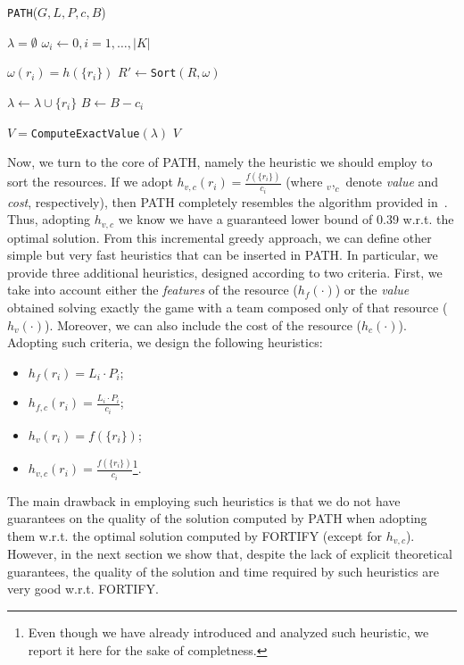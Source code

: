 \begin{algorithm}\caption{\texttt{PATH}($G,L,P,c,B$)}\label{alg:approximation}
\begin{algorithmic}[1]
\State $\lambda = \emptyset$\label{alg:init_1}
\State $\omega_i \leftarrow 0, i=1,\ldots,|K|$\label{alg:init_2}

\label{alg:give_values}
	\State $\omega(r_i) = h(\{r_i\})$
\EndFor
\State $R' \leftarrow $\texttt{Sort}$(R,\omega)$\label{alg:sort}

\label{alg:insert_init}
		\State $\lambda \leftarrow \lambda \cup \{r_i\}$
		\State $B \leftarrow B - c_i$
	\EndWhile
\EndFor\label{alg:insert_end}

\State $V = $\texttt{ComputeExactValue}$(\lambda)$\label{alg:evaluate}
\State \Return $V$
\end{algorithmic}
\end{algorithm}

Now, we turn to the core of PATH, namely the heuristic we should employ to sort the resources. If we adopt $h_{v,c}(r_i) = \frac{f(\{r_i\})}{c_i}$ (where $_v, _c$ denote \textit{value} and \textit{cost}, respectively), then PATH completely resembles the algorithm provided in~\cite{khuller1999budgeted}. Thus, adopting $h_{v,c}$ we know we have a guaranteed lower bound of 0.39 w.r.t. the optimal solution. From this incremental greedy approach, we can define other simple but very fast heuristics that can be inserted in PATH. In particular, we provide three additional heuristics, designed according to two criteria. First, we take into account either the \textit{features} of the resource ($h_f(\cdot)$) or the \textit{value} obtained solving exactly the game with a team composed only of that resource ($h_v(\cdot)$). Moreover, we can also include the cost of the resource ($h_c(\cdot)$). Adopting such criteria, we design the following heuristics:
\begin{itemize}
\item $h_{f}(r_i) = L_i \cdot P_i$;
\item $h_{f,c}(r_i) = \frac{L_i \cdot P_i}{c_i}$;
\item $h_{v}(r_i) = f(\{r_i\})$;
\item $h_{v,c}(r_i) = \frac{f(\{r_i\})}{c_i}$\footnote{Even though we have already introduced and analyzed such heuristic, we report it here for the sake of completness.}.
\end{itemize}

The main drawback in employing such heuristics is that we do not have guarantees on the quality of the solution computed by PATH when adopting them w.r.t. the optimal solution computed by FORTIFY (except for $h_{v,c}$). However, in the next section we show that, despite the lack of explicit theoretical guarantees, the quality of the solution and time required by such heuristics are very good w.r.t. FORTIFY.

